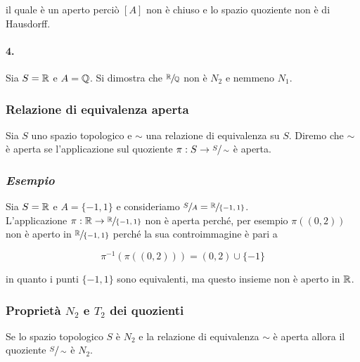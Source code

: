 il quale è un aperto perciò $ [A] $ non è chiuso e lo spazio quoziente non è di Hausdorff.

\paragraph{4.}

Sia $ S = \mathbb{R} $ e $ A = \mathbb{Q} $. Si dimostra che $ \sfrac{\mathbb{R}}{\mathbb{Q}} $ non è $ N_{2} $ e nemmeno $ N_{1} $.

\subsubsection{Relazione di equivalenza aperta}

Sia $ S $ uno spazio topologico e $ \sim $ una relazione di equivalenza su $ S $. Diremo che $ \sim $ è aperta se l'applicazione sul quoziente $ \pi : S \to \sfrac{S}{\sim} $ è aperta.

\subsubsection{\textit{Esempio}}

Sia $ S = \mathbb{R} $ e $ A = \{-1,1\} $ e consideriamo $ \sfrac{S}{A} = \sfrac{\mathbb{R}}{\{-1,1\}} $.\\
L'applicazione $ \pi : \mathbb{R} \to \sfrac{\mathbb{R}}{\{-1,1\}} $ non è aperta perché, per esempio $ \pi((0,2)) $ non è aperto in $ \sfrac{\mathbb{R}}{\{-1,1\}} $ perché la sua controimmagine è pari a

\begin{equation}
	\pi^{-1}(\pi((0,2))) = (0,2) \cup \{-1\}
\end{equation}

in quanto i punti $ \{-1,1\} $ sono equivalenti, ma questo insieme non è aperto in $ \mathbb{R} $.

\subsubsection{Proprietà $ N_{2} $ e $ T_{2} $ dei quozienti}

\begin{definition}\label{prop-n2}
	Se lo spazio topologico $ S $ è $ N_{2} $ e la relazione di equivalenza $ \sim $ è aperta allora il quoziente $ \sfrac{S}{\sim} $ è $ N_{2} $.
\end{definition}

